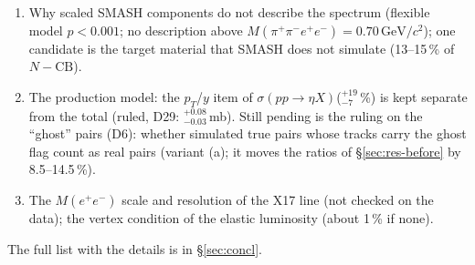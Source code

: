 \documentclass[11pt,a4paper]{article}
\newcommand{\Mfour}{\ensuremath{M(\pi^{+}\pi^{-}e^{+}e^{-})}\xspace}
\newcommand{\Mee}{\ensuremath{M(e^{+}e^{-})}\xspace}
\newcommand{\GeVcc}{\ensuremath{\mathrm{GeV}/c^{2}}\xspace}
\newcommand{\sigeta}{\ensuremath{\sigma(pp\to\eta X)}\xspace}
\begin{document}
\begin{enumerate}
      \S\ref{sec:c2recon}), to be applied until a future simulation corrects the angle in GEANT itself, which is not expected.
\item Why scaled SMASH components do not describe the spectrum (flexible model $p<0.001$; no description above \Mfour$=0.70$\,\GeVcc); one
      candidate is the target material that SMASH does not simulate (13--15\,\% of $N-\mathrm{CB}$).
\item The production model: the $p_T$/$y$ item of \sigeta ($^{+19}_{-7}$\,\%) is kept separate from the total (ruled, D29: $^{+0.08}_{-0.03}$\,mb).
      Still pending is the ruling on the
      ``ghost'' pairs (D6): whether simulated true pairs whose tracks carry the ghost flag count as real pairs (variant (a); it moves the
      ratios of \S\ref{sec:res-before} by 8.5--14.5\,\%).
\item The \Mee scale and resolution of the X17 line (not checked on the data); the vertex condition of the elastic luminosity (about 1\,\% if none).
\end{enumerate}
The full list with the details is in \S\ref{sec:concl}.

\end{document}
